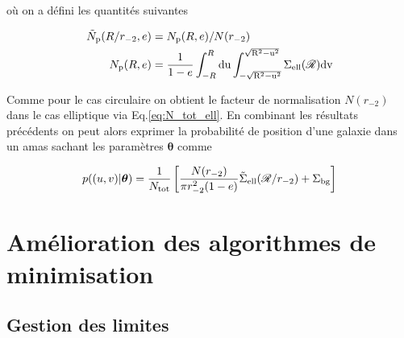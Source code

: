 \documentclass[a4paper,11pt]{article}
\numberwithin{equation}{section}
\begin{document}
	où on a défini les quantités suivantes
	
	\begin{align*}
		\tilde{N}_{\rm{p}} (R/r_{-2}, e) & = N_{\rm{p}}(R , e) / N(r_{-2}) \\
		N_{\rm{p}} (R, e) & = \frac{1}{1-e}  \int_{-R}^R \rm{du} \int_{- \sqrt{R^2 - u^2}}^{\sqrt{R^2 - u^2}} \Sigma_{\rm{ell}} ( \mathscr{R} ) \rm{dv}
	\end{align*}
	
	Comme pour le cas circulaire on obtient le facteur de normalisation $N(r_{-2})$ dans le cas elliptique via Eq.\ref{eq:N_tot_ell}.
	En combinant les résultats précédents on peut alors exprimer la probabilité de position d'une galaxie dans un amas sachant les paramètres $\bm{\theta}$ comme
	
	\begin{equation}
		p( (u,v) | \bm{\theta}) = \frac{1}{N_{\rm{tot}}} \left [ \frac{N(r_{-2})}{\pi r_{-2}^2 (1 -e)} \tilde{\Sigma}_{\rm{ell}} (\mathscr{R}/r_{-2}) + \Sigma_{\rm{bg}} \right ]
	\end{equation}
	
	
	
	
	
\newpage
\section{Amélioration des algorithmes de minimisation}

  \subsection{Gestion des limites}
  
\end{document}
